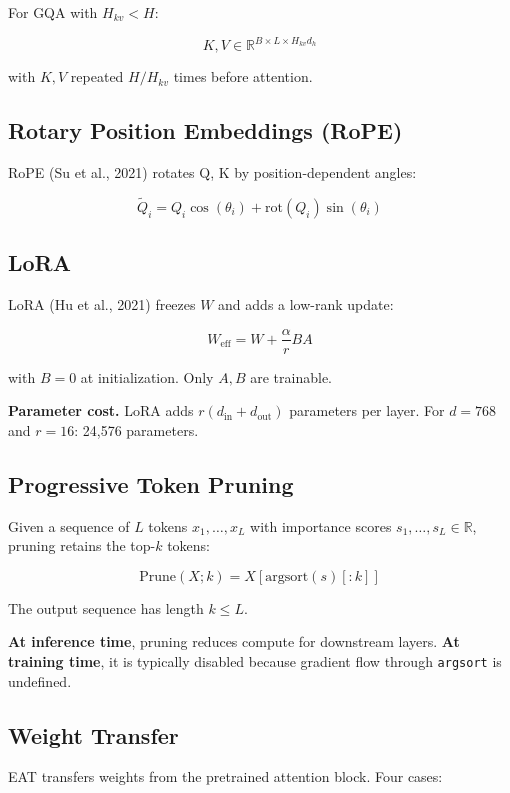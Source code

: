 For GQA with $H_{kv} < H$:

\[
K, V \in \mathbb{R}^{B \times L \times H_{kv} d_h}
\tag{3.3}
\]

with $K, V$ repeated $H / H_{kv}$ times before attention.

\subsection{Rotary Position Embeddings (RoPE)}

RoPE (Su et al., 2021) rotates Q, K by position-dependent angles:

\[
\tilde{Q}_i = Q_i \cos(\theta_i) + \text{rot}(Q_i) \sin(\theta_i)
\tag{3.4}
\]

\subsection{LoRA}

LoRA (Hu et al., 2021) freezes $W$ and adds a low-rank update:

\[
W_\text{eff} = W + \frac{\alpha}{r} B A
\tag{3.5}
\]

with $B = 0$ at initialization. Only $A, B$ are trainable.

\textbf{Parameter cost.} LoRA adds $r(d_\text{in} + d_\text{out})$ parameters 
per layer. For $d = 768$ and $r = 16$: 24,576 parameters.

\subsection{Progressive Token Pruning}

Given a sequence of $L$ tokens $x_1, \dots, x_L$ with importance scores 
$s_1, \dots, s_L \in \mathbb{R}$, pruning retains the top-$k$ tokens:

\[
\text{Prune}(X; k) = X[\text{argsort}(s)[:k]]
\tag{3.6}
\]

The output sequence has length $k \leq L$.

\textbf{At inference time}, pruning reduces compute for downstream layers. 
\textbf{At training time}, it is typically disabled because gradient flow through 
\texttt{argsort} is undefined.

\subsection{Weight Transfer}

EAT transfers weights from the pretrained attention block. Four cases:

